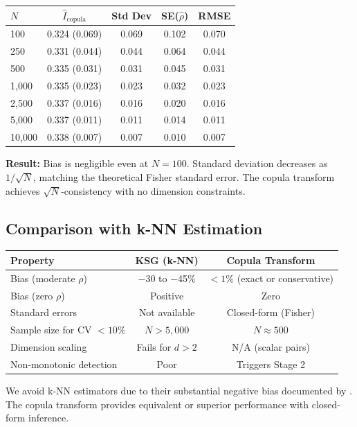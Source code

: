\documentclass[10pt]{article} %
\theoremstyle{plain}
\theoremstyle{definition}
\newcommand{\MI}{I}
\begin{document}
\begin{center}
\begin{tabular}{lcccc}
\toprule
$N$ & $\widehat{\MI}_{\text{copula}}$ & Std Dev & SE($\hat{\rho}$) & RMSE \\
\midrule
100 & 0.324 (0.069) & 0.069 & 0.102 & 0.070 \\
250 & 0.331 (0.044) & 0.044 & 0.064 & 0.044 \\
500 & 0.335 (0.031) & 0.031 & 0.045 & 0.031 \\
1,000 & 0.335 (0.023) & 0.023 & 0.032 & 0.023 \\
2,500 & 0.337 (0.016) & 0.016 & 0.020 & 0.016 \\
5,000 & 0.337 (0.011) & 0.011 & 0.014 & 0.011 \\
10,000 & 0.338 (0.007) & 0.007 & 0.010 & 0.007 \\
\bottomrule
\end{tabular}
\end{center}

\textbf{Result:} Bias is negligible even at $N = 100$. Standard deviation decreases as $1/\sqrt{N}$, matching the theoretical Fisher standard error. The copula transform achieves $\sqrt{N}$-consistency with no dimension constraints.

\subsection{Comparison with k-NN Estimation}

\begin{center}
\begin{tabular}{lcc}
\toprule
Property & KSG (k-NN) & Copula Transform \\
\midrule
Bias (moderate $\rho$) & $-$30 to $-$45\% & $< 1\%$ (exact or conservative) \\
Bias (zero $\rho$) & Positive & Zero \\
Standard errors & Not available & Closed-form (Fisher) \\
Sample size for CV $< 10\%$ & $N > 5{,}000$ & $N \approx 500$ \\
Dimension scaling & Fails for $d > 2$ & N/A (scalar pairs) \\
Non-monotonic detection & Poor & Triggers Stage 2 \\
\bottomrule
\end{tabular}
\end{center}

We avoid k-NN estimators due to their substantial negative bias documented by \citet{vandenberg2025linfoot}. The copula transform provides equivalent or superior performance with closed-form inference.
\end{document}

